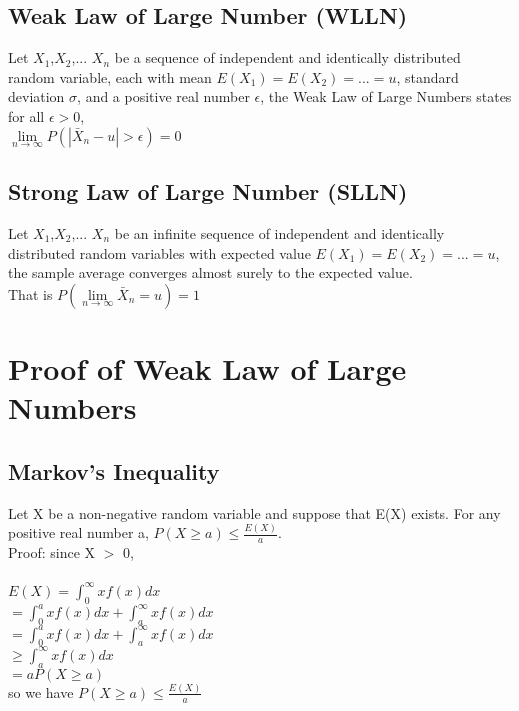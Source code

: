 \documentclass{article}
\begin{document}
\subsection{Weak Law of Large Number (WLLN)}
\hspace{4mm} Let $X_1 $,$X_2$,... $X_n$ be a sequence of independent and identically distributed random variable, each with mean $E(X_1)=E(X_2)=...=u$, standard deviation $\sigma$, and a positive real number $\epsilon$, the Weak Law of Large Numbers states for all $\epsilon >0$,\\ $\lim\limits_{n \to \infty}P( |\bar{X}_n-u|> \epsilon)=0$
\subsection{Strong Law of Large Number (SLLN)}
\hspace{4mm} Let $X_1 $,$X_2$,... $X_n$ be an infinite sequence of independent and identically distributed random variables with expected value $E(X_1)=E(X_2)=...=u$, the sample average converges almost surely to the expected value.\\
That is $P(\lim\limits_{n \to \infty} \bar X_n = u) =1$

\section{Proof of Weak Law of Large Numbers}
\subsection{Markov's Inequality}
\hspace{4mm} Let X be a non-negative random variable and suppose that E(X) exists. For any positive real number a, 
$P(X \geq a)\leq\frac{E(X)}{a}$.\\
Proof: since X $>$ 0,\\ \\
$E(X)=\int_{0}^{\infty}xf(x)dx$\\
\indent \indent $=\int_{0}^{a}xf(x)dx+\int_{a}^{\infty}xf(x)dx$\\
\indent \indent $=\int_{0}^{a}xf(x)dx+\int_{a}^{\infty}xf(x)dx$ \\
\indent \indent $\geq\int_{a}^{\infty}xf(x)dx $ \\
\indent \indent $=aP(X\geq a)$ \\
so we have $P(X \geq a) \leq \frac{E(X)}{a}$ 
\end{document}
